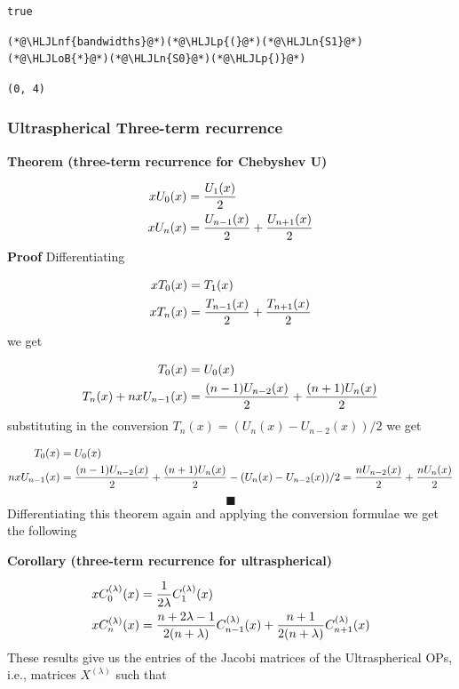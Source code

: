 \documentclass[12pt,a4paper]{article}
\newcommand{\HLJLn}[1]{#1}
\newcommand{\HLJLnf}[1]{\textcolor[RGB]{66,102,213}{#1}}
\newcommand{\HLJLoB}[1]{\textcolor[RGB]{102,102,102}{\textbf{#1}}}
\newcommand{\HLJLp}[1]{#1}
\begin{document}
\begin{lstlisting}
true
\end{lstlisting}


\begin{lstlisting}
(*@\HLJLnf{bandwidths}@*)(*@\HLJLp{(}@*)(*@\HLJLn{S1}@*)(*@\HLJLoB{*}@*)(*@\HLJLn{S0}@*)(*@\HLJLp{)}@*)
\end{lstlisting}

\begin{lstlisting}
(0, 4)
\end{lstlisting}


\subsubsection{Ultraspherical Three-term recurrence}
\textbf{Theorem (three-term recurrence for Chebyshev U)}


\begin{align*}
x U_0(x) &= {U_1(x) \over 2} \\
x U_n(x) &= {U_{n-1}(x) \over 2} + {U_{n+1}(x) \over 2}
\end{align*}
\textbf{Proof} Differentiating


\begin{align*}
 x T_0(x) &= T_1(x) \\
x T_n(x)  &=  {T_{n-1}(x) \over 2} + {T_{n+1}(x) \over 2}
\end{align*}
we get


\begin{align*}
  T_0(x) &= U_0(x) \\
 T_n(x) + n x U_{n-1}(x)  &=  {(n-1) U_{n-2}(x) \over 2} + {(n+1) U_n(x) \over 2}
\end{align*}
substituting in the conversion $T_n(x) = (U_n(x) - U_{n-2}(x))/2$ we get


\begin{align*}
  T_0(x) &= U_0(x) \\
 n x U_{n-1}(x)  &=  {(n-1) U_{n-2}(x) \over 2} + {(n+1) U_n(x) \over 2} - (U_n(x) - U_{n-2}(x))/2 = {n U_{n-2}(x) \over 2} + {n U_n(x) \over 2}
\end{align*}
\[
\blacksquare
\]
Differentiating this theorem again and applying the conversion formulae we get the following

\textbf{Corollary (three-term recurrence for ultraspherical)}


\begin{align*}
x C_0^{(\lambda)}(x) &= {1 \over 2\lambda } C_1^{(\lambda)}(x) \\
 x C_n^{(\lambda)}(x) &=  {n+2\lambda-1 \over 2(n+\lambda)} C_{n-1}^{(\lambda)}(x) + {n+1 \over 2(n+\lambda)} C_{n+1}^{(\lambda)}(x)
\end{align*}
These results give us the entries of the Jacobi matrices of the Ultraspherical OPs, i.e., matrices $X^{(\lambda)}$ such that
\end{document}
